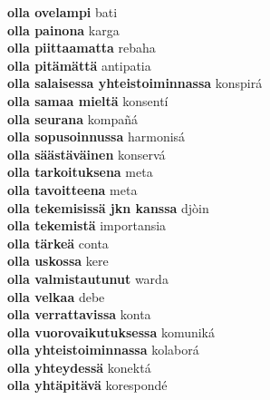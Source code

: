 \textbf{ olla ovelampi  } bati \\
\textbf{ olla painona  } karga \\
\textbf{ olla piittaamatta  } rebaha \\
\textbf{ olla pitämättä  } antipatia \\
\textbf{ olla salaisessa yhteistoiminnassa  } konspirá \\
\textbf{ olla samaa mieltä  } konsentí \\
\textbf{ olla seurana  } kompañá \\
\textbf{ olla sopusoinnussa  } harmonisá \\
\textbf{ olla säästäväinen  } konservá \\
\textbf{ olla tarkoituksena  } meta \\
\textbf{ olla tavoitteena  } meta \\
\textbf{ olla tekemisissä jkn kanssa  } djòin \\
\textbf{ olla tekemistä  } importansia \\
\textbf{ olla tärkeä  } conta \\
\textbf{ olla uskossa  } kere \\
\textbf{ olla valmistautunut  } warda \\
\textbf{ olla velkaa  } debe \\
\textbf{ olla verrattavissa  } konta \\
\textbf{ olla vuorovaikutuksessa  } komuniká \\
\textbf{ olla yhteistoiminnassa  } kolaborá \\
\textbf{ olla yhteydessä  } konektá \\
\textbf{ olla yhtäpitävä  } korespondé \\
